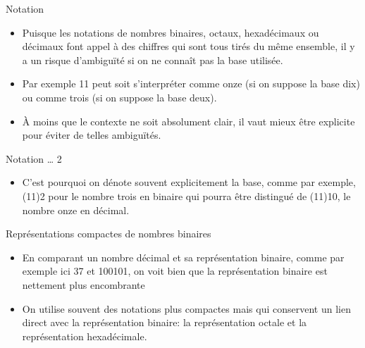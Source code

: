 \documentclass[presentation]{beamer}
\begin{document}
\begin{frame}[label={sec:orgf14f2f6}]{Notation}
\begin{itemize}
\item Puisque les notations de nombres binaires, octaux, hexadécimaux ou décimaux font appel à des chiffres qui sont tous tirés du même ensemble, il y a un risque d’ambiguïté si on ne connaît pas la base utilisée.

\item Par exemple 11 peut soit s'interpréter comme onze (si on suppose la base dix) ou comme trois (si on suppose la base deux).

\item À moins que le contexte ne soit absolument clair, il vaut mieux être explicite pour éviter de telles ambiguïtés.
\end{itemize}
\end{frame}

\begin{frame}[label={sec:org91925cc}]{Notation \ldots{} 2}
\begin{itemize}
\item C'est pourquoi on dénote souvent explicitement la base, comme par exemple, (11)2 pour le nombre trois en binaire qui pourra être distingué de (11)10, le nombre onze en décimal.
\end{itemize}
\end{frame}

\begin{frame}[label={sec:org937e747}]{Représentations compactes de nombres binaires}
\begin{itemize}
\item En comparant un nombre décimal et sa représentation binaire, comme par exemple ici 37 et 100101, on voit bien que la représentation binaire est nettement plus encombrante

\item On utilise souvent des notations plus compactes mais qui conservent un lien direct avec la représentation binaire: la représentation \alert{octale} et la représentation \alert{hexadécimale}.
\end{itemize}
\end{frame}
\end{document}
